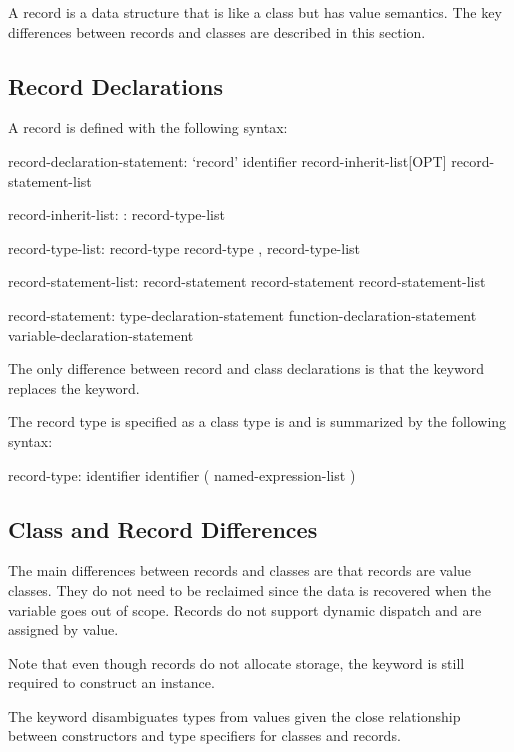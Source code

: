\label{Records}

A record is a data structure that is like a class but has value
semantics.  The key differences between records and classes are
described in this section.

\subsection{Record Declarations}
\label{Record_Declarations}

A record is defined with the following syntax:
\begin{syntax}
record-declaration-statement:
  `record' identifier record-inherit-list[OPT] {
    record-statement-list }

record-inherit-list:
  : record-type-list

record-type-list:
  record-type
  record-type , record-type-list

record-statement-list:
  record-statement
  record-statement record-statement-list

record-statement:
  type-declaration-statement
  function-declaration-statement
  variable-declaration-statement
\end{syntax}
The only difference between record and class declarations is that
the  keyword replaces the  keyword.

The record type is specified as a class type is and is summarized by
the following syntax:
\begin{syntax}
record-type:
  identifier
  identifier ( named-expression-list )
\end{syntax}

\subsection{Class and Record Differences}
\label{Class_and_Record_Differences}

The main differences between records and classes are that records are
value classes.  They do not need to be reclaimed since the data is
recovered when the variable goes out of scope.  Records do not support
dynamic dispatch and are assigned by value.

Note that even though records do not allocate storage, the 
keyword is still required to construct an instance.
\begin{rationale}
The  keyword disambiguates types from values given the close
relationship between constructors and type specifiers for classes and
records.
\end{rationale}

